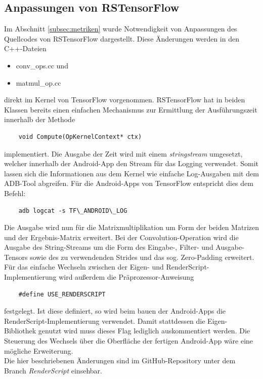 \subsection{Anpassungen von RSTensorFlow}
\label{subsec:anpassungentf}
Im Abschnitt \ref{subsec:metriken} wurde Notwendigkeit von Anpassungen des Quellcodes von RSTensorFlow dargestellt. Diese Änderungen werden in den C++-Dateien 
\begin{itemize}
	\item conv\_ops.cc und
	\item matmul\_op.cc
\end{itemize}
direkt im Kernel von TensorFlow vorgenommen. RSTensorFlow hat in beiden Klassen bereits einen einfachen Mechanismus zur Ermittlung der Ausführungszeit innerhalb der Methode
\begin{lstlisting}
    void Compute(OpKernelContext* ctx)
\end{lstlisting}
implementiert. Die Ausgabe der Zeit wird mit einem \textit{stringstream} umgesetzt, welcher innerhalb der Android-App den Stream für das Logging verwendet. Somit lassen sich die Informationen aus dem Kernel wie einfache Log-Ausgaben mit dem ADB-Tool abgreifen. Für die Android-Apps von TensorFlow entspricht dies dem Befehl: 
\begin{lstlisting}
    adb logcat -s TF\_ANDROID\_LOG
\end{lstlisting}
Die Ausgabe wird nun für die Matrixmultiplikation um Form der beiden Matrizen und der Ergebnis-Matrix erweitert. Bei der Convolution-Operation wird die Ausgabe des String-Streams um die Form des Eingabe-, Filter- und Ausgabe-Tensors sowie des zu verwendenden Strides und das sog. Zero-Padding erweitert. Für das einfache Wechseln zwischen der Eigen- und RenderScript-Implementierung wird außerdem die Präprozessor-Anweisung 
\begin{lstlisting}
    #define USE_RENDERSCRIPT
\end{lstlisting}
festgelegt. Ist diese definiert, so wird beim bauen der Android-Apps die RenderScript-Implementierung verwendet. Damit stattdessen die Eigen-Bibliothek genutzt wird muss dieses Flag lediglich auskommentiert werden. Die Steuerung des Wechsels über die Oberfläche der fertigen Android-App wäre eine mögliche Erweiterung. 
\\
Die hier beschriebenen Änderungen sind im GitHub-Repository \cite{rstfengelmi} unter dem Branch \textit{RenderScript} einsehbar. 

